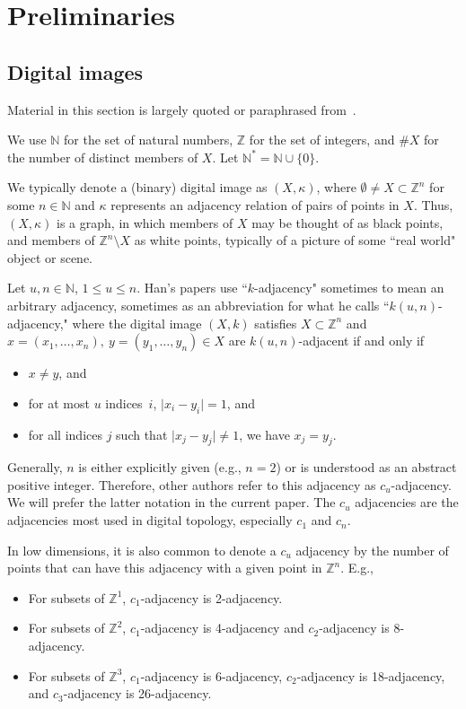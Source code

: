 \documentclass{article} \UseRawInputEncoding
\theoremstyle{plain}
\theoremstyle{definition}
\numberwithin{thm}{section}
\def\Z{{\mathbb Z}}
\def\N{{\mathbb N}}
\begin{document}
\section{Preliminaries}
\subsection{Digital images}
Material in this section is largely quoted or paraphrased from~\cite{BxVariants}.

We use $\N$ for the set of natural numbers, 
$\Z$ for the set of integers, and
$\#X$ for the number of distinct members of $X$. Let $\N^* = \N \cup \{0\}$.

We typically denote a (binary) digital image
as $(X,\kappa)$, where $\emptyset \neq X \subset \Z^n$ for some
$n \in \N$ and $\kappa$ represents an adjacency
relation of pairs of points in $X$. Thus,
$(X,\kappa)$ is a graph, in which members of $X$ may be
thought of as black points, and members of $\Z^n \setminus X$
as white points, typically of a picture of some ``real world" 
object or scene.

Let $u,n \in \N$, $1 \le u \le n$. 
Han's papers use ``$k$-adjacency" sometimes to mean
an arbitrary adjacency, sometimes as an abbreviation
for what he calls ``$k(u,n)$-adjacency," where the
digital image $(X,k)$ satisfies $X \subset \Z^n$ and
$x = (x_1, \ldots, x_n),~y=(y_1, \ldots, y_n) \in X$ 
are $k(u,n)$-adjacent if and only if
\begin{itemize}
    \item $x \neq y$, and
    \item for at most $u$ indices~$i$, 
          $\mid x_i - y_i \mid = 1$, and
    \item for all indices $j$ such that 
          $\mid x_j - y_j \mid \neq 1$, we have
          $x_j = y_j$.
\end{itemize}
Generally, $n$ is either explicitly given (e.g., $n=2$) or is understood
as an abstract positive integer.
Therefore, other authors refer to this adjacency as $c_u$-adjacency.
We will prefer the latter notation in the current paper.
The $c_u$ adjacencies are the adjacencies most used
in digital topology, especially $c_1$ and $c_n$.

In low dimensions, it is also common to denote a
$c_u$ adjacency by the number of points that can
have this adjacency with a given point in $\Z^n$. E.g.,
\begin{itemize}
    \item For subsets of $\Z^1$, $c_1$-adjacency is 2-adjacency.
    \item For subsets of $\Z^2$, $c_1$-adjacency is 4-adjacency and
          $c_2$-adjacency is 8-adjacency.
    \item For subsets of $\Z^3$, $c_1$-adjacency is 6-adjacency,
          $c_2$-adjacency is 18-adjacency, and
          $c_3$-adjacency is 26-adjacency.
\end{itemize}
\end{document}
